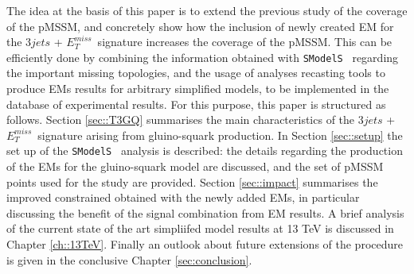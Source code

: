 \documentclass[a4paper,11pt]{article}
\newcommand{\MET}{{ $E_T ^{miss}$}}
\newcommand{\SMO}{\texttt{SModelS\xspace}}
\begin{document}
The idea at the basis of this paper is to extend the previous study of the coverage of the pMSSM, and concretely show how the inclusion of newly created EM for the $3jets$ + \MET~signature increases the coverage of the pMSSM. This can be efficiently done by combining the information obtained with \SMO~ regarding the important missing topologies, and the usage of analyses recasting tools to produce EMs results for arbitrary simplified models, to be implemented in the database of experimental results. For this purpose, this paper is structured as follows. Section \ref{sec::T3GQ} summarises the main characteristics of the $3jets$ + \MET~signature arising from gluino-squark production. In Section \ref{sec::setup} the set up of the \SMO~ analysis is described: the details regarding the production of the EMs for the gluino-squark model are discussed, and the set of pMSSM points used for the study are provided. Section \ref{sec::impact} summarises the improved constrained obtained with the newly added EMs, in particular discussing the benefit of the signal combination from EM results. A brief analysis of the current state of the art simpliifed model results at 13 TeV is discussed in Chapter \ref{ch::13TeV}. Finally an outlook about future extensions of the procedure is given in the conclusive Chapter \ref{sec:conclusion}.  
%
\end{document}
